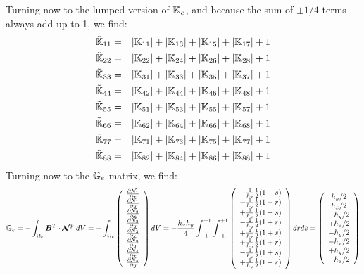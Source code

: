 Turning now to the lumped version of ${\mathbb{K}}_e$, 
and because the sum of $\pm 1/4$ terms always add up to 1, we find:
\begin{eqnarray}
\tilde{{\mathbb{K}}}_{11} &=& |{\mathbb{K}}_{11}| + |{\mathbb{K}}_{13}| + |{\mathbb{K}}_{15}| + |{\mathbb{K}}_{17}| +1 \nonumber\\
\tilde{{\mathbb{K}}}_{22} &=& |{\mathbb{K}}_{22}| + |{\mathbb{K}}_{24}| + |{\mathbb{K}}_{26}| + |{\mathbb{K}}_{28}| +1 \nonumber\\
\tilde{{\mathbb{K}}}_{33} &=& |{\mathbb{K}}_{31}| + |{\mathbb{K}}_{33}| + |{\mathbb{K}}_{35}| + |{\mathbb{K}}_{37}| +1 \nonumber\\
\tilde{{\mathbb{K}}}_{44} &=& |{\mathbb{K}}_{42}| + |{\mathbb{K}}_{44}| + |{\mathbb{K}}_{46}| + |{\mathbb{K}}_{48}| +1 \nonumber\\
\tilde{{\mathbb{K}}}_{55} &=& |{\mathbb{K}}_{51}| + |{\mathbb{K}}_{53}| + |{\mathbb{K}}_{55}| + |{\mathbb{K}}_{57}| +1 \nonumber\\
\tilde{{\mathbb{K}}}_{66} &=& |{\mathbb{K}}_{62}| + |{\mathbb{K}}_{64}| + |{\mathbb{K}}_{66}| + |{\mathbb{K}}_{68}| +1 \nonumber\\
\tilde{{\mathbb{K}}}_{77} &=& |{\mathbb{K}}_{71}| + |{\mathbb{K}}_{73}| + |{\mathbb{K}}_{75}| + |{\mathbb{K}}_{77}| +1 \nonumber\\
\tilde{{\mathbb{K}}}_{88} &=& |{\mathbb{K}}_{82}| + |{\mathbb{K}}_{84}| + |{\mathbb{K}}_{86}| + |{\mathbb{K}}_{88}| +1 \nonumber
\end{eqnarray}
Turning now to the ${\mathbb{G}}_e$ matrix, we find:
\[
{\mathbb{G}}_e = -\int_{\Omega_e} {\bm B}^T \cdot {\bm {{\mathcal{N}}}}^p \;
dV
=-\int_{\Omega_e}
\left(
\begin{array}{c}
\frac{\partial {\mathcal{N}}_1}{\partial x} \\
\frac{\partial {\mathcal{N}}_1}{\partial y} \\
\frac{\partial {\mathcal{N}}_2}{\partial x} \\
\frac{\partial {\mathcal{N}}_2}{\partial y} \\
\frac{\partial {\mathcal{N}}_3}{\partial x} \\
\frac{\partial {\mathcal{N}}_3}{\partial y} \\
\frac{\partial {\mathcal{N}}_4}{\partial x} \\
\frac{\partial {\mathcal{N}}_4}{\partial y} 
\end{array}
\right)
dV
=-
\frac{h_xh_y}{4} \int_{-1}^{+1}\int_{-1}^{+1}
\left(
\begin{array}{c}
-\frac{1}{h_x}\frac12 (1-s)\\
-\frac{1}{h_y}\frac12 (1-r)\\
+\frac{1}{h_x}\frac12 (1-s)\\
-\frac{1}{h_y}\frac12 (1+r)\\
+\frac{1}{h_x}\frac12 (1+s)\\
+\frac{1}{h_y}\frac12 (1+r)\\
-\frac{1}{h_x}\frac12 (1+s)\\
+\frac{1}{h_y}\frac12 (1-r)
\end{array}
\right)
drds
=
\left(
\begin{array}{c}
h_y/2\\
h_x/2\\
-h_y/2\\
+h_x/2\\
-h_y/2\\
-h_x/2\\
+h_y/2\\
-h_x/2
\end{array}
\right)
\]
